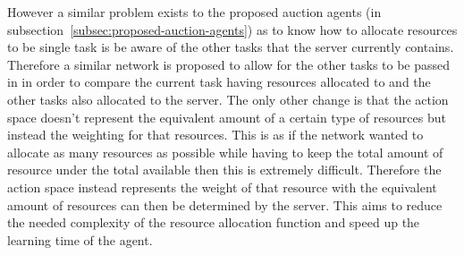 However a similar problem exists to the proposed auction agents (in subsection~\ref{subsec:proposed-auction-agents}) as
to know how to allocate resources to be single task is be aware of the other tasks that the server currently contains.
Therefore a similar network is proposed to allow for the other tasks to be passed in in order to compare the current
task having resources allocated to and the other tasks also allocated to the server. The only other change is that
the action space doesn't represent the equivalent amount of a certain type of resources but instead the weighting
for that resources. This is as if the network wanted to allocate as many resources as possible while having to keep
the total amount of resource under the total available then this is extremely difficult. Therefore the action space
instead represents the weight of that resource with the equivalent amount of resources can then be determined by the
server. This aims to reduce the needed complexity of the resource allocation function and speed up the learning time
of the agent.

